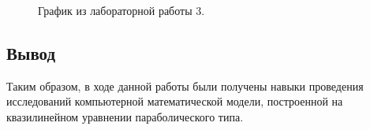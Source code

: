 \documentclass[a4paper,14pt]{article}
\begin{document}
\newpage
\begin{figure}[!h]
	\caption{График из лабораторной работы 3.}
	\label{fig:good}
\end{figure}


\subsection*{Вывод}

Таким образом, в ходе данной работы были получены навыки 
проведения исследований компьютерной математической модели,
построенной на квазилинейном уравнении параболического типа.
\end{document}
